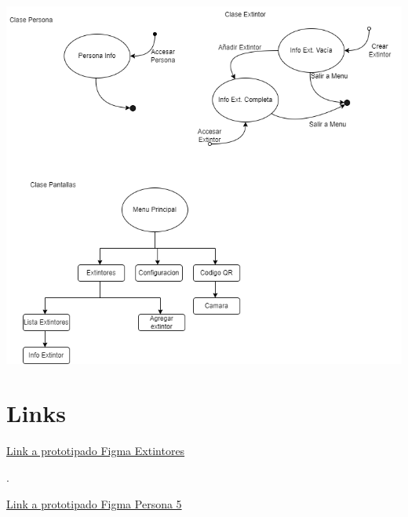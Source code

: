 \documentclass[a4paper,twoside,10pt]{report}
\begin{document}
\includegraphics[width=1.0\textwidth]{El Gaming.png}

\newpage

\chapter{Links}

\href{https://www.figma.com/proto/lLCAXTlBZbxjpSGAWeCUPA/Skibidi-Gaming%7D?node-id=4-2&starting-point-node-id=4%3A2&mode=design&t=Sb1RTF0nqBBg2zxP-1}{Link a prototipado Figma Extintores}

\par .

\href{https://www.figma.com/proto/dMNLjaKBg1HFK16ZhoUZpI/Personongus?node-id=1-2&starting-point-node-id=1%3A2&mode=design&t=QmBVzDDLniVyYANz-1}{Link a prototipado Figma Persona 5}
\end{document}

